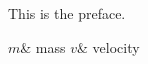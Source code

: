 \begin{preface}
  This is the preface.
\end{preface}

\tableofcontents

\listoftables

\listoffigures

\listofprotocols

\listofschemes

\begin{symbols}
  $m$& mass\cr
  $v$& velocity\cr
\end{symbols}

